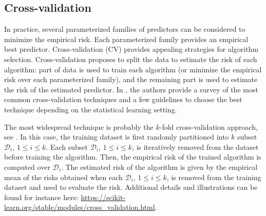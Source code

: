 \subsection*{Cross-validation} 
In practice, several parameterized families of predictors can be considered to minimize the empirical risk. Each parameterized family provides an empirical best predictor. Cross-validation (CV) provides appealing strategies for algorithm selection. Cross-validation proposes to split the data to estimate the risk of each algorithm: part of data  is used  to train each
algorithm (or minimize the empirical risk over each parameterized family), and the remaining part is used to estimate
the risk of the estimated predictor.  In \cite{arlot2010survey}, the authors provide a survey of the most common cross-validation techniques and a few  guidelines to choose the best technique depending on the statistical learning setting. 

The most widespread technique is probably the $k$-fold cross-validation approach, see \cite{geisser1975predictive}. In this case, the training dataset is first randomly  partitioned into $k$ subset $\mathcal{D}_i$, $1\leqslant i \leqslant k$. Each subset $\mathcal{D}_i$, $1\leqslant i \leqslant k$,  is iteratively removed from the dataset before training the algorithm. Then, the empirical risk of the trained algorithm is computed over $\mathcal{D}_i$. The estimated risk of the algorithm is given by the empirical mean of the risks obtained  when each $\mathcal{D}_i$, $1\leqslant i \leqslant k$, is removed from the training dataset and used to evaluate the risk. Additional details and illustrations can be found for instance here: \url{https://scikit-learn.org/stable/modules/cross\_validation.html}.


